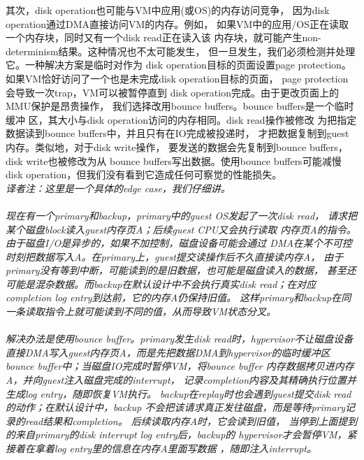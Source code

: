 其次，disk operation也可能与VM中应用(或OS)的内存访问竞争，%
因为disk operation通过DMA直接访问VM的内存。例如，%
如果VM中的应用/OS正在读取一个内存块，同时又有一个disk read正在读入该%
内存块，就可能产生non-determinism结果。这种情况也不太可能发生，%
但一旦发生，我们必须检测并处理它。一种解决方案是临时对作为%
disk operation目标的页面设置page protection。%
如果VM恰好访问了一个也是未完成disk operation目标的页面，%
page protection会导致一次trap，VM可以被暂停直到%
disk operation完成。由于更改页面上的MMU保护是昂贵操作，%
我们选择改用bounce buffers。bounce buffers是一个临时缓冲%
区，其大小与disk operation访问的内存相同。disk read操作被修改%
为把指定数据读到bounce buffers中，并且只有在IO完成被投递时，%
才把数据复制到guest内存。类似地，对于disk write操作，%
要发送的数据会先复制到bounce buffers，disk write也被修改为从%
bounce buffers写出数据。使用bounce buffers可能减慢%
disk operation，但我们没有看到它造成任何可察觉的性能损失。%
\\\emph{译者注：这里是一个具体的edge case，我们仔细讲。%
\\\\现在有一个primary和backup，primary中的guest OS发起了一次disk read，%
请求把某个磁盘block读入guest内存页A；后续guest CPU又会执行读取%
内存页A的指令。由于磁盘I/O是异步的，如果不加控制，磁盘设备可能会通过%
DMA在某个不可控时刻把数据写入A。在primary上，guest提交读操作后不久直接读内存A，%
由于primary没有等到中断，可能读到的是旧数据，也可能是磁盘读入的数据，%
甚至还可能是混杂数据。而backup在默认设计中不会执行真实disk read；在对应%
completion log entry到达前，它的内存A仍保持旧值。%
这样primary和backup在同一条读取指令上就可能读到不同的值，从而导致VM状态分叉。%
\\\\解决办法是使用bounce buffer。primary发生disk read时，hypervisor不让磁盘设备%
直接DMA写入guest内存页A，而是先把数据DMA到hypervisor的临时缓冲区%
bounce buffer中；当磁盘IO完成时暂停VM，将bounce buffer%
内存数据拷贝进内存A，并向guest注入磁盘完成的interrupt，%
记录completion内容及其精确执行位置并生成log entry，随即恢复VM执行。%
backup在replay时也会遇到guest提交disk read的动作；在默认设计中，backup%
不会把该请求真正发往磁盘，而是等待primary记录的read结果和completion。%
后续读取内存A时，它会读到旧值，%
当停到上面提到的来自primary的disk interrupt log entry后，backup的%
hypervisor才会暂停VM，紧接着在拿着log entry里的信息在内存A里面写数据%
，随即注入interrupt。}%

